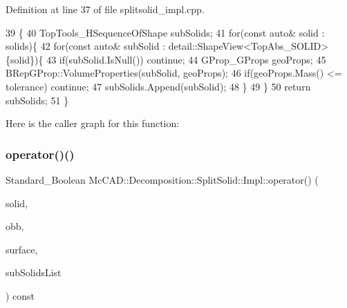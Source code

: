Definition at line 37 of file splitsolid\+\_\+impl.\+cpp.


\begin{DoxyCode}
39                                       \{
40     TopTools\_HSequenceOfShape subSolids;
41     \textcolor{keywordflow}{for}(\textcolor{keyword}{const} \textcolor{keyword}{auto}& solid : solids)\{
42         \textcolor{keywordflow}{for}(\textcolor{keyword}{const} \textcolor{keyword}{auto}& subSolid : detail::ShapeView<TopAbs\_SOLID>\{solid\})\{
43             \textcolor{keywordflow}{if}(subSolid.IsNull()) \textcolor{keywordflow}{continue};
44             GProp\_GProps geoProps;
45             BRepGProp::VolumeProperties(subSolid, geoProps);
46             \textcolor{keywordflow}{if}(geoProps.Mass() <= tolerance) \textcolor{keywordflow}{continue};
47             subSolids.Append(subSolid);
48         \}
49     \}
50     \textcolor{keywordflow}{return} subSolids;
51 \}
\end{DoxyCode}
Here is the caller graph for this function\+:
\mbox{\label{classMcCAD_1_1Decomposition_1_1SplitSolid_1_1Impl_ab28ed049d20e8170ce91740b1fc89fe3}} 
\subsubsection{\texorpdfstring{operator()()}{operator()()}\hspace{0.1cm}{\footnotesize\ttfamily [1/2]}}
{\footnotesize\ttfamily Standard\+\_\+\+Boolean Mc\+C\+A\+D\+::\+Decomposition\+::\+Split\+Solid\+::\+Impl\+::operator() (\begin{DoxyParamCaption}\item[{const Topo\+D\+S\+\_\+\+Solid \&}]{solid,  }\item[{const Bnd\+\_\+\+O\+BB \&}]{obb,  }\item[{const \hyperlink{classMcCAD_1_1Geometry_1_1BoundSurface}{Geometry\+::\+Bound\+Surface} \&}]{surface,  }\item[{Top\+Tools\+\_\+\+H\+Sequence\+Of\+Shape \&}]{sub\+Solids\+List }\end{DoxyParamCaption}) const}

\mbox{\label{classMcCAD_1_1Decomposition_1_1SplitSolid_1_1Impl_ab28ed049d20e8170ce91740b1fc89fe3}} 
